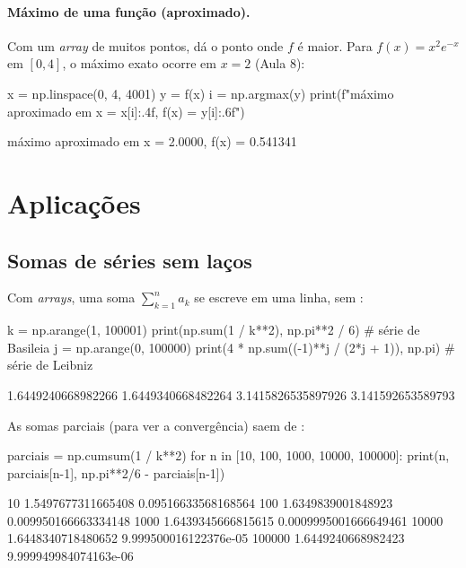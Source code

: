 \paragraph{Máximo de uma função (aproximado).} Com um \emph{array} de muitos pontos,  dá o ponto onde
$f$ é maior. Para $f(x)=x^2e^{-x}$ em $[0,4]$, o máximo exato ocorre em $x=2$ (Aula 8):

\begin{entrada}
x = np.linspace(0, 4, 4001)
y = f(x)
i = np.argmax(y)
print(f"máximo aproximado em x = {x[i]:.4f}, f(x) = {y[i]:.6f}")
\end{entrada}
\begin{saida}
máximo aproximado em x = 2.0000, f(x) = 0.541341
\end{saida}

\section{Aplicações}

\subsection{Somas de séries sem laços}

Com \emph{arrays}, uma soma $\sum_{k=1}^{n} a_k$ se escreve em uma linha, sem :

\begin{entrada}
k = np.arange(1, 100001)
print(np.sum(1 / k**2), np.pi**2 / 6)               # série de Basileia
j = np.arange(0, 100000)
print(4 * np.sum((-1)**j / (2*j + 1)), np.pi)        # série de Leibniz
\end{entrada}
\begin{saida}
1.6449240668982266 1.6449340668482264
3.1415826535897926 3.141592653589793
\end{saida}

As somas parciais (para ver a convergência) saem de :

\begin{entrada}
parciais = np.cumsum(1 / k**2)
for n in [10, 100, 1000, 10000, 100000]:
    print(n, parciais[n-1], np.pi**2/6 - parciais[n-1])
\end{entrada}
\begin{saida}
10 1.5497677311665408 0.09516633568168564
100 1.6349839001848923 0.009950166663334148
1000 1.6439345666815615 0.0009995001666649461
10000 1.6448340718480652 9.999500016122376e-05
100000 1.6449240668982423 9.999949984074163e-06
\end{saida}

